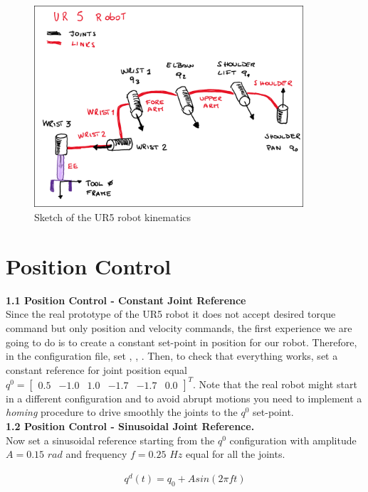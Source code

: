\documentclass[11pt]{article}
\newcommand{\mat}[1]{\ensuremath{\begin{bmatrix}#1\end{bmatrix}}}	%
\begin{document}
	\begin{figure}[bht]
		\centering
		\includegraphics[width=10cm]{pics/ur5_Robot.pdf}
		\caption{Sketch of the UR5 robot kinematics}
		\label{fig:ur5_robot_kinematics}
	\end{figure} 

\section{Position Control}

\textbf{1.1 Position Control - Constant Joint Reference}\\
Since the real prototype of the UR5 robot it does not accept desired torque command but only position and velocity commands, 
the first experience we are going to do is to create a constant set-point in position for our robot. 
Therefore, in the  configuration file, set ,   
, .
Then, to check that everything works, set a constant reference for joint position equal $q^0=\mat{ 0.5& -1.0& 1.0& -1.7& -1.7& 0.0}^T$.
Note that the real robot might start in a different configuration and to avoid abrupt motions you need to implement a \textit{homing} procedure to drive smoothly the joints to  the  $q^0$ set-point. \\

\textbf{1.2 Position Control - Sinusoidal  Joint Reference.}\\
Now set a sinusoidal reference starting from the  $q^0$ configuration with amplitude $A= 0.15$ $rad$ and frequency $f = 0.25$ $Hz$ equal for all the joints.

\begin{align*}
q^d(t) = q_0 + Asin(2\pi f t )
\end{align*} 
\end{document}
